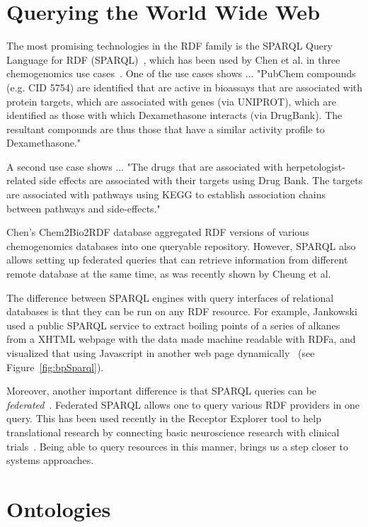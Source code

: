 \documentclass[10pt]{bmc_article}
\newenvironment{bmcformat}{\begin{raggedright}\baselineskip20pt\sloppy\setboolean{publ}{false}}{\end{raggedright}\baselineskip20pt\sloppy}
\begin{document}
\begin{bmcformat}
\section{Querying the World Wide Web}

The most promising technologies in the RDF family is the
SPARQL Query Language for RDF (SPARQL)~\cite{PrudHommeaux2008}, which has been
used by Chen et al. in three chemogenomics use cases~\cite{CHE2010}. 
One of the use cases shows ... "PubChem compounds (e.g. CID 5754) are identified that are active in bioassays that are associated with protein targets, which are associated with genes (via UNIPROT), which are identified as those with which Dexamethasone interacts (via DrugBank). The resultant compounds are thus those that have a similar activity profile to Dexamethasone."

A second use case shows ... "The drugs that are associated with herpetologist-related side effects are associated with their targets using Drug Bank. The targets are associated with pathways using KEGG to establish association chains between pathways and side-effects."

Chen's Chem2Bio2RDF database aggregated RDF versions of various chemogenomics databases
into one queryable repository. However, SPARQL also allows setting up federated
queries that can retrieve information from different remote database at the same
time, as was recently shown by Cheung et al.~\cite{Cheung2009}

The difference between SPARQL engines with query interfaces of relational databases
is that they can be run on any RDF resource. For example, Jankowski used a public
SPARQL service to extract boiling points of a series of alkanes from a XHTML
webpage with the data made machine readable with RDFa, and visualized that using
Javascript in another web page dynamically~\cite{Jankowski2010} (see
Figure~\ref{fig:bpSparql}).

Moreover, another important difference is that SPARQL queries can be
\textit{federated}~\cite{Prudhommeaux2007}.
Federated SPARQL allows one to query various RDF providers in one query. This has
been used recently in the Receptor Explorer tool to help translational research
by connecting basic neuroscience research with clinical trials~\cite{Cheung2009}.
Being able to query resources in this manner, brings us a step closer to
systems approaches.

\section{Ontologies}


\end{bmcformat}
\end{document}
